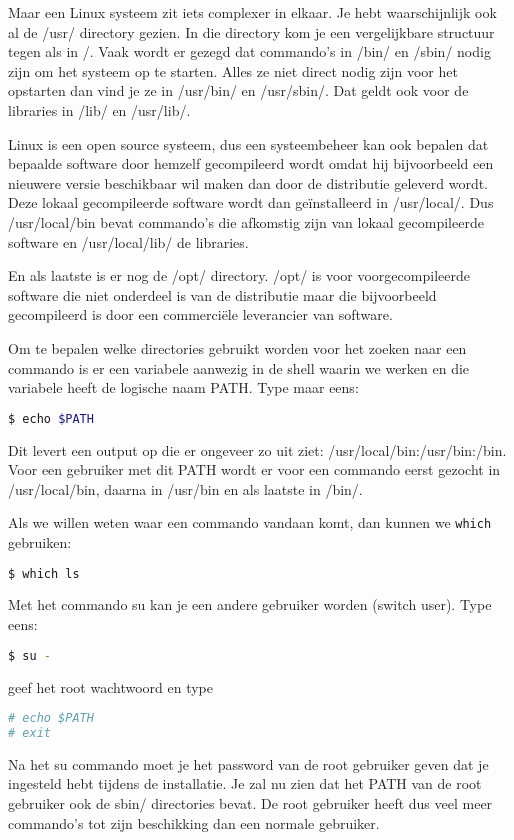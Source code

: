 Maar een Linux systeem zit iets complexer in elkaar. Je hebt waarschijnlijk ook al de /usr/
directory gezien. In die directory kom je een vergelijkbare structuur tegen als in /. Vaak wordt er gezegd dat
commando's in /bin/ en /sbin/ nodig zijn om het systeem op te starten. Alles ze niet direct nodig zijn voor het
opstarten dan vind je ze in /usr/bin/ en /usr/sbin/. Dat geldt ook voor de libraries in /lib/ en /usr/lib/.

Linux is een open source systeem, dus een systeembeheer kan ook bepalen dat bepaalde software
door hemzelf gecompileerd wordt omdat hij bijvoorbeeld een nieuwere versie beschikbaar wil maken dan door de
distributie geleverd wordt. Deze lokaal gecompileerde software wordt dan ge\"installeerd in /usr/local/. Dus
/usr/local/bin bevat commando's die afkomstig zijn van lokaal gecompileerde software en /usr/local/lib/ de libraries.

En als laatste is er nog de /opt/ directory. /opt/ is voor voorgecompileerde software die niet onderdeel is van de
distributie maar die bijvoorbeeld gecompileerd is door een commerci\"ele leverancier van software.

Om te bepalen welke directories gebruikt worden voor het zoeken naar een commando is er een variabele aanwezig in de
shell waarin we werken en die variabele heeft de logische naam PATH. Type maar eens:
\begin{lstlisting}[language=bash]
$ echo $PATH
\end{lstlisting}
Dit levert een output op die er ongeveer zo uit ziet: /usr/local/bin:/usr/bin:/bin. Voor een gebruiker met dit PATH
wordt er voor een commando eerst gezocht in /usr/local/bin, daarna in /usr/bin en als laatste in /bin/.

Als we willen weten waar een commando vandaan komt, dan kunnen we \texttt{which} gebruiken:
\begin{lstlisting}[language=bash]
$ which ls
\end{lstlisting}

Met het commando su kan je een andere gebruiker worden (switch user). Type eens:
\begin{lstlisting}[language=bash]
$ su -
\end{lstlisting}
geef het root wachtwoord en type
\begin{lstlisting}[language=bash]
# echo $PATH
# exit
\end{lstlisting}
Na het su commando moet je het password van de root gebruiker geven dat je ingesteld hebt tijdens
de installatie. Je zal nu zien dat het PATH van de root gebruiker ook de sbin/ directories bevat. De root gebruiker
heeft dus veel meer commando's tot zijn beschikking dan een normale gebruiker.
